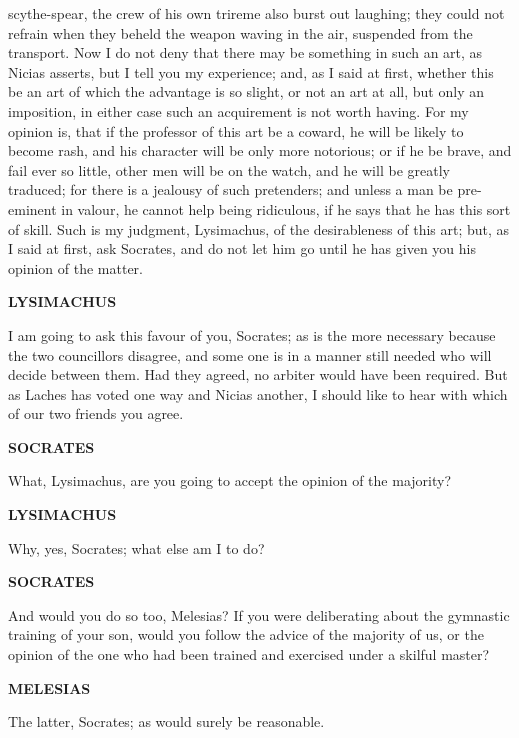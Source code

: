 \documentclass[11pt,letter]{book}
\begin{document}
scythe-spear, the crew of his own trireme also burst out laughing; they could not refrain when they beheld the weapon waving in the air, suspended from the transport. Now I do not deny that there may be something in such an art, as Nicias asserts, but I tell you my experience; and, as I said at first, whether this be an art of which the advantage is so slight, or not an art at all, but only an imposition, in either case such an acquirement is not worth having. For my opinion is, that if the professor of this art be a coward, he will be likely to become rash, and his character will be only more notorious; or if he be brave, and fail ever so little, other men will be on the watch, and he will be greatly traduced; for there is a jealousy of such pretenders; and unless a man be pre-eminent in valour, he cannot help being ridiculous, if he says that he has this sort of skill. Such is my judgment, Lysimachus, of the desirableness of this art; but, as I said at first, ask Socrates, and do not let him go until he has given you his opinion of the matter.

\par \textbf{LYSIMACHUS}
\par   I am going to ask this favour of you, Socrates; as is the more necessary because the two councillors disagree, and some one is in a manner still needed who will decide between them. Had they agreed, no arbiter would have been required. But as Laches has voted one way and Nicias another, I should like to hear with which of our two friends you agree.

\par \textbf{SOCRATES}
\par   What, Lysimachus, are you going to accept the opinion of the majority?

\par \textbf{LYSIMACHUS}
\par   Why, yes, Socrates; what else am I to do?

\par \textbf{SOCRATES}
\par   And would you do so too, Melesias? If you were deliberating about the gymnastic training of your son, would you follow the advice of the majority of us, or the opinion of the one who had been trained and exercised under a skilful master?

\par \textbf{MELESIAS}
\par   The latter, Socrates; as would surely be reasonable.
\end{document}
